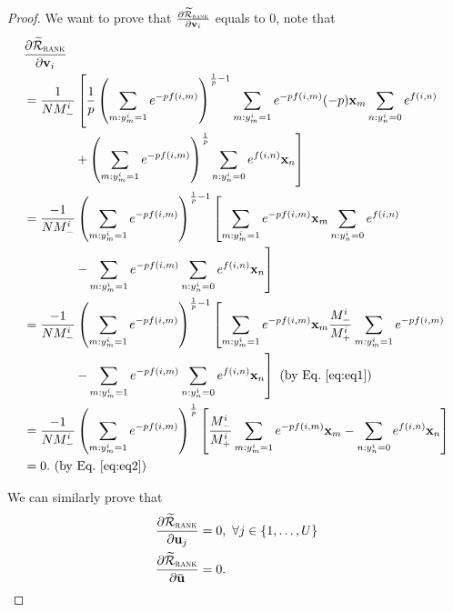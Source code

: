 \begin{proof}
We want to prove that
$\frac{\partial \widetilde{\mathcal{R}}_\textsc{rank}} {\partial \mathbf{v}_i}$ equals to $0$, note that
\begin{equation*}
\begin{aligned}
&\frac{\partial \widetilde{\mathcal{R}}_\textsc{rank}} {\partial \mathbf{v}_i} \\
&= \frac{1}{N M_-^i} \left[ \frac{1}{p} 
   \left( \sum_{m: y_m^i=1} e^{-p f(i, m)} \right)^{\frac{1}{p} - 1} \sum_{m: y_m^i=1} e^{-p f(i, m)} (-p) \mathbf{x}_m \sum_{n: y_n^i=0} e^{f(i, n)} \right. \\
& \hspace{4em} \left.
   + \left( \sum_{m: y_m^i = 1} e^{-p f(i, m)} \right)^\frac{1}{p} \sum_{n: y_n^i = 0} e^{f(i, n)} \mathbf{x}_n \right] \\
&= \frac{-1}{N M_-^i} \left( \sum_{m: y_m^i=1} e^{-p f(i, m)} \right)^{\frac{1}{p} - 1} 
   \left[ \sum_{m: y_m^i=1} e^{-p f(i, m)} \mathbf{x}_m \sum_{n: y_n^i=0} e^{f(i, n)} \right. \\
& \hspace{4em} \left.
   - \sum_{m: y_m^i = 1} e^{-p f(i, m)} \sum_{n: y_n^i = 0} e^{f(i, n)} \mathbf{x}_n \right] \\
&= \frac{-1}{N M_-^i} \left( \sum_{m: y_m^i=1} e^{-p f(i, m)} \right)^{\frac{1}{p} - 1} 
   \left[ \sum_{m: y_m^i=1} e^{-p f(i, m)} \mathbf{x}_m \frac{M_-^i}{M_+^i} \sum_{m: y_m^i=1} e^{-p f(i, m)} \right. \\
& \hspace{4em} \left.
   - \sum_{m: y_m^i = 1} e^{-p f(i, m)} \sum_{n: y_n^i = 0} e^{f(i, n)} \mathbf{x}_n \right] \ \text{(by Eq.~\ref{eq:eq1})} \\
&= \frac{-1}{N M_-^i} \left( \sum_{m: y_m^i=1} e^{-p f(i, m)} \right)^\frac{1}{p} 
   \left[ \frac{M_-^i}{M_+^i} \sum_{m: y_m^i=1} e^{-p f(i, m)} \mathbf{x}_m - \sum_{n: y_n^i = 0} e^{f(i, n)} \mathbf{x}_n \right] \\
&= 0. \ \text{(by Eq.~\ref{eq:eq2})}
\end{aligned}
\end{equation*}

We can similarly prove that 
\begin{equation*}
\begin{aligned}
\frac{\partial \widetilde\RCal_\textsc{rank}}{\partial \bu_j} &= 0, \ \forall j \in \{1,\dots,U\} \\
\frac{\partial \widetilde\RCal_\textsc{rank}}{\partial \widebar{\bu}} &= 0.
\end{aligned}
\end{equation*}

\end{proof}


